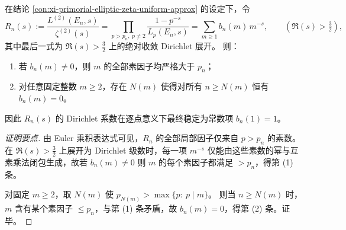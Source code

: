 \begin{conclusion}[比值 Dirichlet 级数的粗支撑与系数稳定：前缀对齐 \texorpdfstring{$\Rightarrow$}{=>} 有限支撑坍缩]\label{con:xi-primorial-ratio-dirichlet-support-stability}
在结论 \ref{con:xi-primorial-elliptic-zeta-uniform-approx} 的设定下，令
\[
R_n(s):=\frac{L^{(2)}(E_n,s)}{\zeta^{(2)}(s)}
=\prod_{p>p_n,\ p\neq 2}\frac{1-p^{-s}}{L_p(E_n,s)}
=\sum_{m\ge 1} b_{n}(m)\,m^{-s},
\qquad (\Re(s)>\tfrac32),
\]
其中最后一式为 \(\Re(s)>\tfrac32\) 上的绝对收敛 Dirichlet 展开。
则：
\begin{enumerate}
  \item 若 \(b_n(m)\neq 0\)，则 \(m\) 的全部素因子均严格大于 \(p_n\)；
  \item 对任意固定整数 \(m\ge 2\)，存在 \(N(m)\) 使得对所有 \(n\ge N(m)\) 恒有 \(b_n(m)=0\)。
\end{enumerate}
因此 \(R_n(s)\) 的 Dirichlet 系数在逐点意义下最终稳定为常数项 \(b_n(1)=1\)。
\end{conclusion}
\begin{proof}[证明要点]
由 Euler 乘积表达式可见，\(R_n\) 的全部局部因子仅来自 \(p>p_n\) 的素数。
在 \(\Re(s)>\tfrac32\) 上展开为 Dirichlet 级数时，每一项 \(m^{-s}\) 仅能由这些素数的幂与互素乘法闭包生成，故若 \(b_n(m)\neq 0\) 则 \(m\) 的每个素因子都满足 \(>p_n\)，得第 (1) 条。
\par
对固定 \(m\ge 2\)，取 \(N(m)\) 使 \(p_{N(m)}>\max\{p:\ p\mid m\}\)。
则当 \(n\ge N(m)\) 时，\(m\) 含有某个素因子 \(\le p_n\)，与第 (1) 条矛盾，故 \(b_n(m)=0\)，得第 (2) 条。证毕。
\end{proof}

